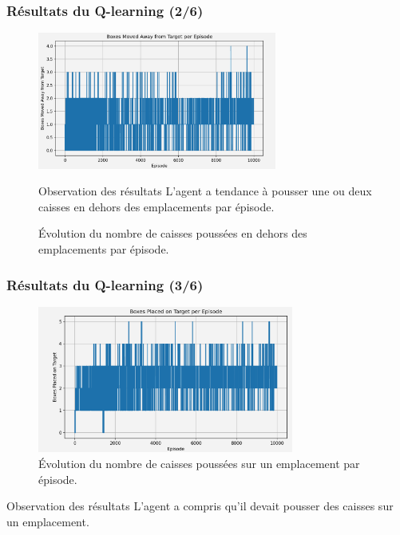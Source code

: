 \documentclass[
	11pt, %
]{beamer}
\begin{document}
\begin{frame}
    \frametitle{Résultats du Q-learning (2/6)}
    \begin{figure}
        \centering
        \includegraphics[width=0.7\textwidth]{Images/resultat2.png}
        \caption{Évolution du nombre de caisses poussées en dehors des emplacements par épisode.}
		\begin{block}{Observation des résultats}
			\small L'agent a tendance à pousser une ou deux caisses en dehors des emplacements par épisode.
		\end{block}
    \end{figure}
\end{frame}

\begin{frame}
    \frametitle{Résultats du Q-learning (3/6)}
    \begin{figure}
        \centering
        \includegraphics[width=0.75\textwidth]{Images/resultat4.png}
        \caption{Évolution du nombre de caisses poussées sur un emplacement par épisode.}
    \end{figure}
	\begin{block}{Observation des résultats}
        \footnotesize L'agent a compris qu'il devait pousser des caisses sur un emplacement.
    \end{block}
\end{frame}
\end{document}
